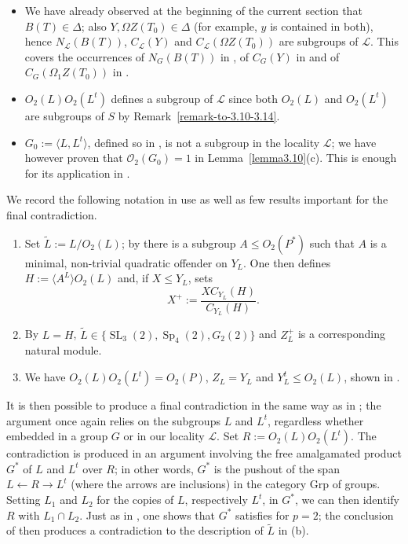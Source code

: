 \documentclass{amsart}
\numberwithin{equation}{section}
\theoremstyle{definition}
\theoremstyle{subresult}
\theoremstyle{caseresult}
\renewcommand{\L}{\mathcal{L}}
\newcommand{\coll}{\mathcal{O}}
\newcommand{\SL}{\operatorname{SL}}
\newcommand{\Sp}{\operatorname{Sp}}
\newcommand{\wde}{\widetilde}
\newcommand{\<}{\langle}
\renewcommand{\>}{\rangle}
\begin{document}
\begin{itemize}
	\item We have already observed at the beginning of the current section that $B(T) \in \Delta$; also $Y, \Omega Z(T_0) \in \Delta$ (for example, $y$ is contained in both), hence $N_\L(B(T))$, $C_\L(Y)$ and $C_\L(\Omega Z(T_0))$ are subgroups of $\L$. This covers the occurrences of $N_G(B(T))$ in \cite[Lemma 3.14]{Meier-Stell-Stroth:2012}, of $C_G(Y)$ in \cite[Lemma 3.19]{Meier-Stell-Stroth:2012} and of $C_G(\Omega_1 Z(T_0))$ in \cite[Lemma 3.12]{Meier-Stell-Stroth:2012}.
	\item $O_2(L)O_2(L^t)$ defines a subgroup of $\L$ since both $O_2(L)$ and $O_2(L^t)$ are subgroups of $S$ by Remark~\ref{remark-to-3.10-3.14}.
	\item $G_0 := \< L,L^t\>$, defined so in \cite[Notation 3.24]{Meier-Stell-Stroth:2012}, is not a subgroup in the locality $\L$; we have however proven that $\coll_2(G_0) = 1$ in Lemma~\ref{lemma3.10}(c). This is enough for its application in \cite[Lemma 3.25]{Meier-Stell-Stroth:2012}.
\end{itemize}

We record the following notation in use as well as few results important for the final contradiction.

\begin{enumerate}[label=(\alph*)]
	\item Set $\wde{L} := L/O_2(L)$; by \cite[Lemma 3.14(d)]{Meier-Stell-Stroth:2012} there is a subgroup $A \le O_2(P^*)$ such that $A$ is a minimal, non-trivial quadratic offender on $Y_L$. One then defines $H := \<A^L\>O_2(L)$ and, if $X \le Y_L$, sets
	\[
	X^+ := \frac{X C_{Y_L}(H)}{C_{Y_L}(H)}.
	\]
	\item By \cite[Lemma 2.23(a)]{Meier-Stell-Stroth:2012} $L=H$, $\wde{L} \in \{\SL_3(2), \Sp_4(2), G_2(2)\}$ and $Z_L^+$ is a corresponding natural module.
	\item We have $O_2(L)O_2(L^t) = O_2(P)$, $Z_L = Y_L$ and $Y_L^t \le O_2(L)$, shown in \cite[Lemma 3.26(a),(e) and 3.27]{Meier-Stell-Stroth:2012}.
\end{enumerate}

It is then possible to produce a final contradiction in the same way as in \cite[3.28]{Meier-Stell-Stroth:2012}; the argument once again relies on the subgroups $L$ and $L^t$, regardless whether embedded in a group $G$ or in our locality $\L$.
Set $R := O_2(L)O_2(L^t)$. The contradiction is produced in an argument involving the free amalgamated product $G^*$ of $L$ and $L^t$ over $R$; in other words, $G^*$ is the pushout of the span $L \leftarrow R \rightarrow L^t$ (where the arrows are inclusions) in the category $\mathrm{Grp}$ of groups. Setting $L_1$ and $L_2$ for the copies of $L$, respectively $L^t$, in $G^*$, we can then identify $R$ with $L_1 \cap L_2$. Just as in \cite{Meier-Stell-Stroth:2012}, one shows that $G^*$ satisfies \cite[Hypothesis 1]{Parmeggiani:2009II} for $p=2$; the conclusion of \cite[Main Theorem]{Parmeggiani:2009II} then produces a contradiction to the description of $\wde{L}$ in (b).\\
\end{document}
